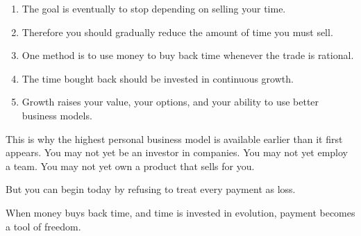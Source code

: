 \begin{enumerate}
\item The goal is eventually to stop depending on selling your time.
\item Therefore you should gradually reduce the amount of time you must sell.
\item One method is to use money to buy back time whenever the trade is rational.
\item The time bought back should be invested in continuous growth.
\item Growth raises your value, your options, and your ability to use better business models.
\end{enumerate}

This is why the highest personal business model is available earlier than it first appears. You may not yet be an investor in companies. You may not yet employ a team. You may not yet own a product that sells for you.

But you can begin today by refusing to treat every payment as loss.

When money buys back time, and time is invested in evolution, payment becomes a tool of freedom.

